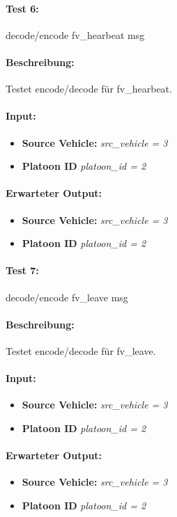 \documentclass[a4paper, 12pt, titlepage]{scrartcl}
\begin{document}
{			\paragraph{Test 6:}{decode/encode fv\_hearbeat msg}
			\paragraph{Beschreibung:} Testet encode/decode für fv\_hearbeat.
			\paragraph{Input:}
			\begin{itemize} \itemsep-0.5em
				\item \textbf{Source Vehicle:} \emph{src\_vehicle = 3}
				\item \textbf{Platoon ID} \emph{platoon\_id = 2}
			\end{itemize}
			\paragraph{Erwarteter Output:}
			\begin{itemize} \itemsep-0.5em
				\item \textbf{Source Vehicle:} \emph{src\_vehicle = 3}
				\item \textbf{Platoon ID} \emph{platoon\_id = 2}
			\end{itemize}

			\paragraph{Test 7:}{decode/encode fv\_leave msg}
			\paragraph{Beschreibung:} Testet encode/decode für fv\_leave.
			\paragraph{Input:}
			\begin{itemize} \itemsep-0.5em
				\item \textbf{Source Vehicle:} \emph{src\_vehicle = 3}
				\item \textbf{Platoon ID} \emph{platoon\_id = 2}
			\end{itemize}
			\paragraph{Erwarteter Output:}
			\begin{itemize} \itemsep-0.5em
				\item \textbf{Source Vehicle:} \emph{src\_vehicle = 3}
				\item \textbf{Platoon ID} \emph{platoon\_id = 2}
			\end{itemize}	

}
\end{document}
